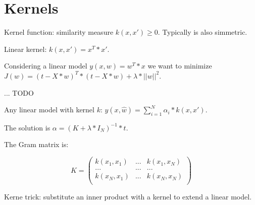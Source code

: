 \section{Kernels}

Kernel function: similarity measure $k(x,x') \geq 0$. Typically is also simmetric.

Linear kernel: $k(x,x') = x^T*x'$.

Considering a linear model $y(x,w)=w^T*x$ we want to minimize $J(w) = (t - X*w)^T*(t - X*w) + \lambda*||w||^2$.

... TODO

Any linear model with kernel $k$: $y(x, \hat{w}) = \sum_{i=1}^N \alpha_i *k(x,x')$.

The solution is $\alpha = (K + \lambda*I_N)^{-1}*t$.

The Gram matrix is:

\[
K = \begin{pmatrix}
k(x_1,x_1) & ... & k(x_1, x_N) \\
... & ... & ... \\
k(x_N,x_1) & ... & k(x_N, x_N) \\
\end{pmatrix}
\]

Kerne trick: substitute an inner product with a kernel to extend a linear model.


